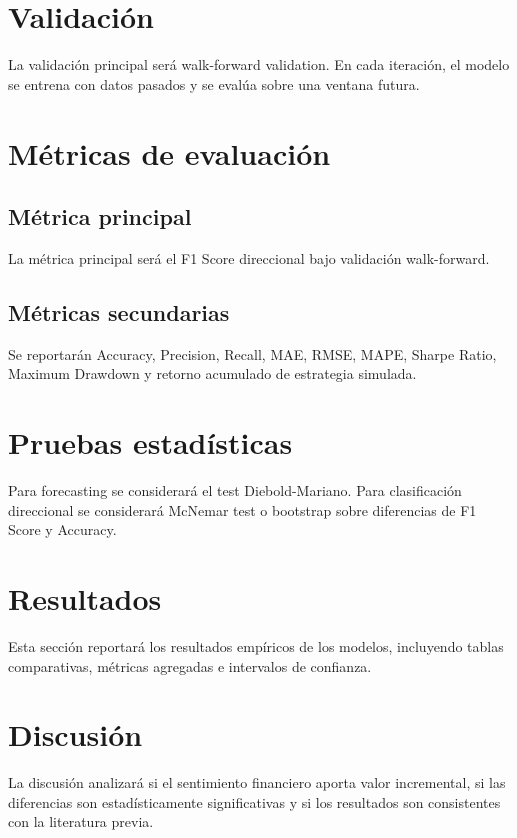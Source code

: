 \documentclass[12pt,a4paper]{article}
\begin{document}
\section{Validación}

La validación principal será walk-forward validation. En cada iteración, el modelo se entrena con datos pasados y se evalúa sobre una ventana futura.

\section{Métricas de evaluación}

\subsection{Métrica principal}

La métrica principal será el F1 Score direccional bajo validación walk-forward.

\subsection{Métricas secundarias}

Se reportarán Accuracy, Precision, Recall, MAE, RMSE, MAPE, Sharpe Ratio, Maximum Drawdown y retorno acumulado de estrategia simulada.

\section{Pruebas estadísticas}

Para forecasting se considerará el test Diebold-Mariano. Para clasificación direccional se considerará McNemar test o bootstrap sobre diferencias de F1 Score y Accuracy.

\section{Resultados}

Esta sección reportará los resultados empíricos de los modelos, incluyendo tablas comparativas, métricas agregadas e intervalos de confianza.

\section{Discusión}

La discusión analizará si el sentimiento financiero aporta valor incremental, si las diferencias son estadísticamente significativas y si los resultados son consistentes con la literatura previa.
\end{document}
